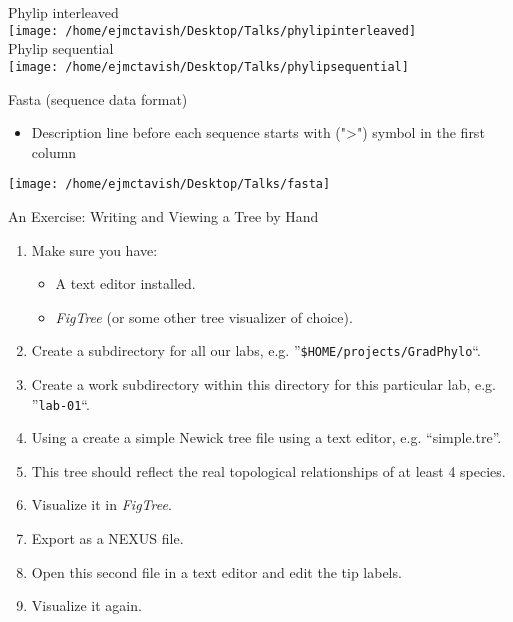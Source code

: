 \documentclass{beamer}
\begin{document}
\begin{frame}
Phylip interleaved\\
\texttt{[image: /home/ejmctavish/Desktop/Talks/phylipinterleaved]}\\
Phylip sequential\\
\texttt{[image: /home/ejmctavish/Desktop/Talks/phylipsequential]}
\end{frame}



\begin{frame}
Fasta (sequence data format)\\
\begin{itemize}
 \item Description line before each sequence starts with (">") symbol in the first column
\end{itemize}
\texttt{[image: /home/ejmctavish/Desktop/Talks/fasta]}
\end{frame}



\begin{frame}{An Exercise: Writing and Viewing a Tree by Hand}
    \begin{enumerate}
        \item   Make sure you have:
            \begin{itemize}
                \item   A text editor installed.
                \item   \textit{FigTree} (or some other tree visualizer of choice).
            \end{itemize}
        \item   Create a subdirectory for all our labs, e.g. ''\texttt{\$HOME/projects/GradPhylo}``.
        \item   Create a work subdirectory within this directory for this particular lab, e.g. ''\texttt{lab-01}``.
        \item   Using a create a simple Newick tree file using a text editor, e.g. ``simple.tre''.
        \item   This tree should reflect the real topological relationships of at least 4 species.
        \item   Visualize it in \textit{FigTree}.
        \item   Export as a NEXUS file.
        \item   Open this second file in a text editor and edit the tip labels.
        \item   Visualize it again.
    \end{enumerate}
\end{frame}
\end{document}
